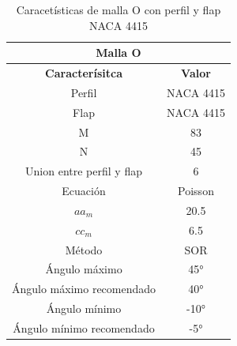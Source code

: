 \documentclass[letterpaper, openright, 12pt]{book}
\begin{document}
    \begin{table}[htbp!]
    \begin{center}
        \begin{tabular}{| c | c |}
        \hline
        \multicolumn{2}{|c|}{Malla O}\\

        \hline
        \textbf{Caracterísitca} & \textbf{Valor} \\ \hline

        Perfil & NACA 4415
        \\ \hline

        Flap & NACA 4415
        \\ \hline

        M & 83
        \\ \hline

        N & 45
        \\ \hline

        Union entre perfil y flap & 6
        \\ \hline

        Ecuación & Poisson
        \\\hline

        $aa_m$ & 20.5
        \\ \hline

        $cc_m$ & 6.5
        \\ \hline

        Método & SOR
        \\\hline

        Ángulo máximo & 45\si{\degree}
        \\ \hline

        Ángulo máximo recomendado & 40\si{\degree}
        \\ \hline

        Ángulo mínimo & -10\si{\degree}
        \\ \hline

        Ángulo mínimo recomendado & -5\si{\degree}
        \\ \hline
        \end{tabular}
        \caption{Caracetísticas de malla O con perfil y flap NACA 4415}
    \label{tabla_o_naca_4415_flap}
    \end{center}
    \end{table}
\end{document}
